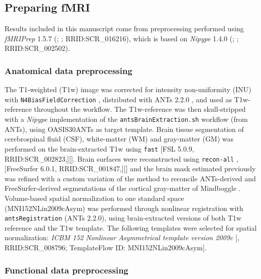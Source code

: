 \documentclass[10pt,letterpaper]{article}
\begin{document}
\subsection*{Preparing fMRI}
\label{methods:fmriprep}

Results included in this manuscript come from preprocessing performed
using \emph{fMRIPrep} 1.5.7 (\cite{fmriprep1}; \cite{fmriprep2}; RRID:SCR\_016216),
which is based on \emph{Nipype} 1.4.0
(\cite{nipype1}; \cite{nipype2}; RRID:SCR\_002502).


\subsubsection*{Anatomical data preprocessing}
\label{methods:anat}

The T1-weighted (T1w) image was corrected for intensity non-uniformity
(INU) with \texttt{N4BiasFieldCorrection} \cite{n4}, distributed with
ANTs 2.2.0 \cite[RRID:SCR\_004757]{ants}, and used as T1w-reference
throughout the workflow.
The T1w-reference was then skull-stripped with a \emph{Nipype} implementation
of the \texttt{antsBrainExtraction.sh} workflow (from ANTs), using OASIS30ANTs
as target template.
Brain tissue segmentation of cerebrospinal fluid (CSF), white-matter (WM) and
gray-matter (GM) was performed on the brain-extracted T1w using
\texttt{fast} \cite{fsl_fast} [FSL 5.0.9, RRID:SCR\_002823,][].
Brain surfaces were reconstructed using \texttt{recon-all} \cite{fs_reconall},
[FreeSurfer 6.0.1, RRID:SCR\_001847,][] and the brain mask estimated
previously was refined with a custom variation of the method to
reconcile ANTs-derived and FreeSurfer-derived segmentations of the
cortical gray-matter of Mindboggle \cite[RRID:SCR\_002438,]{mindboggle}.
Volume-based spatial normalization to one standard space (MNI152NLin2009cAsym)
was performed through nonlinear registration with \texttt{antsRegistration}
(ANTs 2.2.0), using brain-extracted versions of both T1w reference and the T1w template.
The following templates were selected for spatial normalization: \emph{ICBM 152 Nonlinear
Asymmetrical template version 2009c} {[}\cite{mni152nlin2009casym},
RRID:SCR\_008796; TemplateFlow ID: MNI152NLin2009cAsym{]}.

\subsubsection*{Functional data preprocessing}
\label{methods:func}
\end{document}
